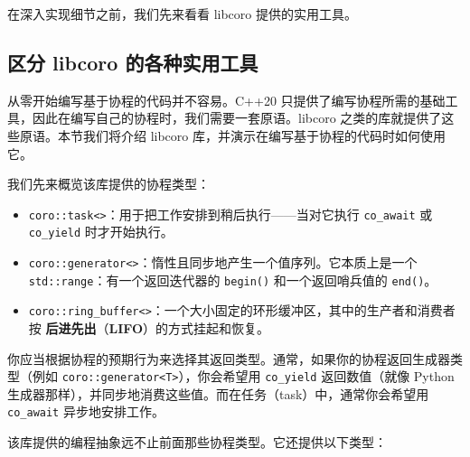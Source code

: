 在深入实现细节之前，我们先来看看 libcoro 提供的实用工具。

\subsection{区分 libcoro 的各种实用工具}

\label{idx:1263}
\label{idx:1264}
从零开始编写基于协程的代码并不容易。C++20 只提供了编写协程所需的基础工具，因此在编写自己的协程时，我们需要一套原语。libcoro 之类的库就提供了这些原语。本节我们将介绍 libcoro 库，并演示在编写基于协程的代码时如何使用它。

我们先来概览该库提供的协程类型：

\begin{itemize}
\item \texttt{coro::\allowbreak{}task<>}：用于把工作安排到稍后执行——当对它执行 \texttt{co\_await} 或 \texttt{co\_yield} 时才开始执行。
\item \texttt{coro::\allowbreak{}generator<>}：惰性且同步地产生一个值序列。它本质上是一个 \texttt{std::\allowbreak{}range}：有一个返回迭代器的 \texttt{begin()} 和一个返回哨兵值的 \texttt{end()}。
\label{idx:1265}
\item \texttt{coro::\allowbreak{}ring\_\allowbreak{}buffer<>}：一个大小固定的环形缓冲区，其中的生产者和消费者按 \textbf{后进先出}（\textbf{LIFO}）的方式挂起和恢复。
\end{itemize}

你应当根据协程的预期行为来选择其返回类型。通常，如果你的协程返回生成器类型（例如 \texttt{coro::\allowbreak{}generator<T>}），你会希望用 \texttt{co\_yield} 返回数值（就像 Python 生成器那样），并同步地消费这些值。而在任务（task）中，通常你会希望用 \texttt{co\_await} 异步地安排工作。

\label{idx:1266}
该库提供的编程抽象远不止前面那些协程类型。它还提供以下类型：

